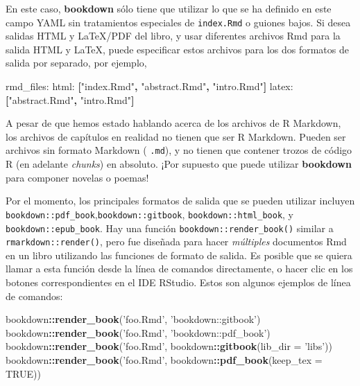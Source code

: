 \documentclass[12pt,]{krantz}
\makeatletter
\newenvironment{Shaded}{\begin{snugshade}}{\end{snugshade}}
\newcommand{\KeywordTok}[1]{\textcolor[rgb]{0.13,0.29,0.53}{\textbf{#1}}}
\newcommand{\DataTypeTok}[1]{\textcolor[rgb]{0.13,0.29,0.53}{#1}}
\newcommand{\StringTok}[1]{\textcolor[rgb]{0.31,0.60,0.02}{#1}}
\newcommand{\OtherTok}[1]{\textcolor[rgb]{0.56,0.35,0.01}{#1}}
\newcommand{\FunctionTok}[1]{\textcolor[rgb]{0.00,0.00,0.00}{#1}}
\newcommand{\OperatorTok}[1]{\textcolor[rgb]{0.81,0.36,0.00}{\textbf{#1}}}
\newcommand{\AttributeTok}[1]{\textcolor[rgb]{0.77,0.63,0.00}{#1}}
\newcommand{\NormalTok}[1]{#1}
\newenvironment{kframe}{%
\medskip{}
\setlength{\fboxsep}{.8em}
 \def\at@end@of@kframe{}%
 \ifinner\ifhmode%
  \def\at@end@of@kframe{\end{minipage}}%
  \begin{minipage}{\columnwidth}%
 \fi\fi%
 \def\FrameCommand##1{\hskip\@totalleftmargin \hskip-\fboxsep
 \colorbox{shadecolor}{##1}\hskip-\fboxsep
     \hskip-\linewidth \hskip-\@totalleftmargin \hskip\columnwidth}%
 \MakeFramed {\advance\hsize-\width
   \@totalleftmargin\z@ \linewidth\hsize
   \@setminipage}}%
 {\par\unskip\endMakeFramed%
 \at@end@of@kframe}
\renewenvironment{Shaded}{\begin{kframe}}{\end{kframe}}
\theoremstyle{definition}
\theoremstyle{definition}
\theoremstyle{definition}
\theoremstyle{remark}
\makeatother
\begin{document}
En este caso, \textbf{bookdown} sólo tiene que utilizar lo que se ha
definido en este campo YAML sin tratamientos especiales de
\texttt{index.Rmd} o guiones bajos. Si desea salidas HTML y LaTeX/PDF
del libro, y usar diferentes archivos Rmd para la salida HTML y LaTeX,
puede especificar estos archivos para los dos formatos de salida por
separado, por ejemplo,

\begin{Shaded}
\begin{Highlighting}[]
\FunctionTok{rmd_files:}
  \FunctionTok{html:}\AttributeTok{ }\KeywordTok{[}\StringTok{"index.Rmd"}\KeywordTok{,} \StringTok{"abstract.Rmd"}\KeywordTok{,} \StringTok{"intro.Rmd"}\KeywordTok{]}
  \FunctionTok{latex:}\AttributeTok{ }\KeywordTok{[}\StringTok{"abstract.Rmd"}\KeywordTok{,} \StringTok{"intro.Rmd"}\KeywordTok{]}
\end{Highlighting}
\end{Shaded}

A pesar de que hemos estado hablando acerca de los archivos de R
Markdown, los archivos de capítulos en realidad no tienen que ser R
Markdown. Pueden ser archivos sin formato Markdown ( \texttt{.md}), y no
tienen que contener trozos de código R (en adelante \emph{chunks}) en
absoluto. ¡Por supuesto que puede utilizar \textbf{bookdown} para
componer novelas o poemas!

Por el momento, los principales formatos de salida que se pueden
utilizar incluyen
\texttt{bookdown::pdf\_book},\texttt{bookdown::gitbook},
\texttt{bookdown::html\_book}, y \texttt{bookdown::epub\_book}. Hay una
función \texttt{bookdown::render\_book()}
 similar a \texttt{rmarkdown::render()},
pero fue diseñada para hacer \emph{múltiples} documentos Rmd en un libro
utilizando las funciones de formato de salida. Es posible que se quiera
llamar a esta función desde la línea de comandos directamente, o hacer
clic en los botones correspondientes en el IDE RStudio. Estos son
algunos ejemplos de línea de comandos:

\begin{Shaded}
\begin{Highlighting}[]
\NormalTok{bookdown}\OperatorTok{::}\KeywordTok{render_book}\NormalTok{(}\StringTok{'foo.Rmd'}\NormalTok{, }\StringTok{'bookdown::gitbook'}\NormalTok{)}
\NormalTok{bookdown}\OperatorTok{::}\KeywordTok{render_book}\NormalTok{(}\StringTok{'foo.Rmd'}\NormalTok{, }\StringTok{'bookdown::pdf_book'}\NormalTok{)}
\NormalTok{bookdown}\OperatorTok{::}\KeywordTok{render_book}\NormalTok{(}\StringTok{'foo.Rmd'}\NormalTok{, bookdown}\OperatorTok{::}\KeywordTok{gitbook}\NormalTok{(}\DataTypeTok{lib_dir =} \StringTok{'libs'}\NormalTok{))}
\NormalTok{bookdown}\OperatorTok{::}\KeywordTok{render_book}\NormalTok{(}\StringTok{'foo.Rmd'}\NormalTok{, bookdown}\OperatorTok{::}\KeywordTok{pdf_book}\NormalTok{(}\DataTypeTok{keep_tex =} \OtherTok{TRUE}\NormalTok{))}
\end{Highlighting}
\end{Shaded}
\end{document}
